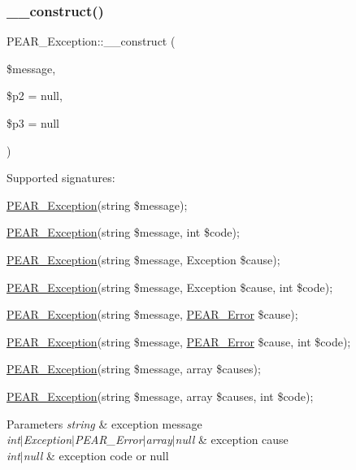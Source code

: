 \subsubsection{\texorpdfstring{\+\_\+\+\_\+construct()}{\_\_construct()}}
{\footnotesize\ttfamily P\+E\+A\+R\+\_\+\+Exception\+::\+\_\+\+\_\+construct (\begin{DoxyParamCaption}\item[{}]{\$message,  }\item[{}]{\$p2 = {\ttfamily null},  }\item[{}]{\$p3 = {\ttfamily null} }\end{DoxyParamCaption})}

Supported signatures\+:
\begin{DoxyItemize}
\item \hyperlink{classPEAR__Exception}{P\+E\+A\+R\+\_\+\+Exception}(string \$message);
\item \hyperlink{classPEAR__Exception}{P\+E\+A\+R\+\_\+\+Exception}(string \$message, int \$code);
\item \hyperlink{classPEAR__Exception}{P\+E\+A\+R\+\_\+\+Exception}(string \$message, Exception \$cause);
\item \hyperlink{classPEAR__Exception}{P\+E\+A\+R\+\_\+\+Exception}(string \$message, Exception \$cause, int \$code);
\item \hyperlink{classPEAR__Exception}{P\+E\+A\+R\+\_\+\+Exception}(string \$message, \hyperlink{classPEAR__Error}{P\+E\+A\+R\+\_\+\+Error} \$cause);
\item \hyperlink{classPEAR__Exception}{P\+E\+A\+R\+\_\+\+Exception}(string \$message, \hyperlink{classPEAR__Error}{P\+E\+A\+R\+\_\+\+Error} \$cause, int \$code);
\item \hyperlink{classPEAR__Exception}{P\+E\+A\+R\+\_\+\+Exception}(string \$message, array \$causes);
\item \hyperlink{classPEAR__Exception}{P\+E\+A\+R\+\_\+\+Exception}(string \$message, array \$causes, int \$code); 
\begin{DoxyParams}{Parameters}
{\em string} & exception message \\
\hline
{\em int$\vert$\+Exception$\vert$\+P\+E\+A\+R\+\_\+\+Error$\vert$array$\vert$null} & exception cause \\
\hline
{\em int$\vert$null} & exception code or null \\
\hline
\end{DoxyParams}

\end{DoxyItemize}

